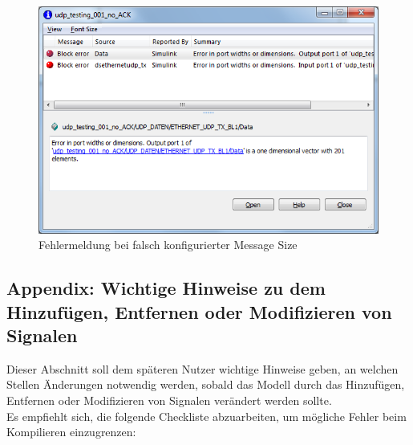 \documentclass[fontsize = 12pt, paper = a4]{scrreprt}
\begin{document}
\begin{figure}[h]
\centering
\includegraphics[scale = 0.48]{fehlermsgsize}
\caption[Fehlermeldung bei falsch konfigurierter Message Size]{Fehlermeldung bei falsch konfigurierter Message Size}
\label{fehlermsgsize}
\end{figure} 

\newpage


\subsection{Appendix: Wichtige Hinweise zu dem Hinzufügen, Entfernen oder Modifizieren von Signalen}

Dieser Abschnitt soll dem späteren Nutzer wichtige Hinweise geben, an welchen Stellen Änderungen notwendig werden, sobald das Modell durch das Hinzufügen, Entfernen oder Modifizieren von Signalen verändert werden sollte. \\

Es empfiehlt sich, die folgende Checkliste abzuarbeiten, um mögliche Fehler beim Kompilieren einzugrenzen:
\end{document}
